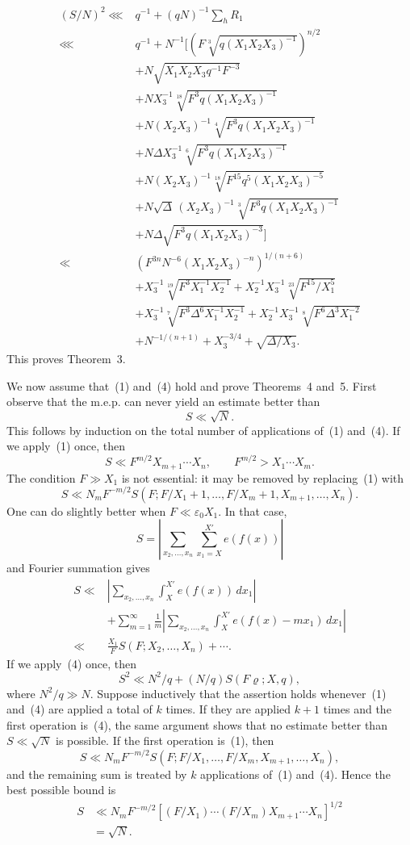 \documentclass[10pt]{article}
\begin{document}
\[
\begin{aligned}
  (S/N)^2
  \lll{}&q^{-1}+(qN)^{-1}\sum_hR_1\\
  \lll{}&q^{-1}+N^{-1}\Bigg[
    \left(F\sqrt[3]{q(X_1X_2X_3)^{-1}}\right)^{n/2}\\
  &+N\sqrt{X_1X_2X_3q^{-1}F^{-3}}\\
  &+NX_3^{-1}\sqrt[18]{F^3q(X_1X_2X_3)^{-1}}\\
  &+N(X_2X_3)^{-1}\sqrt[4]{F^3q(X_1X_2X_3)^{-1}}\\
  &+N\Delta X_3^{-1}\sqrt[6]{F^3q(X_1X_2X_3)^{-1}}\\
  &+N(X_2X_3)^{-1}\sqrt[18]{F^{15}q^5(X_1X_2X_3)^{-5}}\\
  &+N\sqrt\Delta\,(X_2X_3)^{-1}\sqrt[3]{F^3q(X_1X_2X_3)^{-1}}\\
  &+N\Delta\sqrt{F^3q(X_1X_2X_3)^{-3}}
  \Bigg]\\
  \ll{}&\left(F^{3n}N^{-6}(X_1X_2X_3)^{-n}\right)^{1/(n+6)}\\
  &+X_3^{-1}\sqrt[19]{F^3X_1^{-1}X_2^{-1}}
  +X_2^{-1}X_3^{-1}\sqrt[23]{F^{15}/X_1^5}\\
  &+X_3^{-1}\sqrt[7]{F^3\Delta^6X_1^{-1}X_2^{-1}}
  +X_2^{-1}X_3^{-1}\sqrt[8]{F^6\Delta^3X_1^{-2}}\\
  &+N^{-1/(n+1)}+X_3^{-3/4}+\sqrt{\Delta/X_3}.
\end{aligned}
\]
This proves Theorem~3.

We now assume that~(1) and~(4) hold and prove Theorems~4 and~5. First observe that the m.e.p. can never yield an estimate better than
\[
  S\ll\sqrt N.
\]
This follows by induction on the total number of applications of~(1) and~(4). If we apply~(1) once, then
\[
  S\ll F^{m/2}X_{m+1}\cdots X_n,
  \qquad F^{m/2}>X_1\cdots X_m.
\]
The condition $F\gg X_1$ is not essential: it may be removed by replacing~(1) with
\[
  S\ll N_mF^{-m/2}
  S\left(F;F/X_1+1,\ldots,F/X_m+1,X_{m+1},\ldots,X_n\right).
\]
One can do slightly better when $F\ll\varepsilon_0X_1$. In that case,
\[
  S=\left|\sum_{x_2,\ldots,x_n}\sum_{x_1=X}^{X'}e(f(x))\right|
\]
and Fourier summation gives
\[
\begin{aligned}
  S\ll{}&\left|\sum_{x_2,\ldots,x_n}\int_X^{X'}e(f(x))\,dx_1\right|\\
  &+\sum_{m=1}^{\infty}\frac1m
  \left|\sum_{x_2,\ldots,x_n}\int_X^{X'}e(f(x)-mx_1)\,dx_1\right|\\
  \ll{}&\frac{X_1}{F}S(F;X_2,\ldots,X_n)+\cdots.
\end{aligned}
\]
If we apply~(4) once, then
\[
  S^2\ll N^2/q+(N/q)S(F\varrho;X,q),
\]
where $N^2/q\gg N$. Suppose inductively that the assertion holds whenever~(1) and~(4) are applied a total of $k$ times. If they are applied $k+1$ times and the first operation is~(4), the same argument shows that no estimate better than $S\ll\sqrt N$ is possible. If the first operation is~(1), then
\[
  S\ll N_mF^{-m/2}
  S(F;F/X_1,\ldots,F/X_m,X_{m+1},\ldots,X_n),
\]
and the remaining sum is treated by $k$ applications of~(1) and~(4). Hence the best possible bound is
\[
\begin{aligned}
  S&\ll N_mF^{-m/2}
  \left[(F/X_1)\cdots(F/X_m)X_{m+1}\cdots X_n\right]^{1/2}\\
  &=\sqrt N.
\end{aligned}
\]
\end{document}
